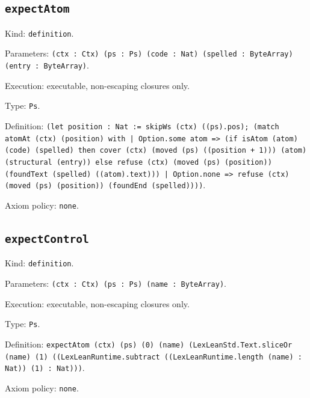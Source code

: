 \documentclass[11pt]{article}
\begin{document}
\subsection*{\texttt{expectAtom}}
\noindent Kind: \texttt{definition}.\par
\noindent Parameters: \texttt{(ctx : Ctx) (ps : Ps) (code : Nat) (spelled : ByteArray) (entry : ByteArray)}.\par
\noindent Execution: executable, non-escaping closures only.\par
\noindent Type: \texttt{Ps}.\par
\noindent Definition: \texttt{(let position : Nat := skipWs (ctx) ((ps).pos); (match atomAt (ctx) (position) with | Option.some atom => (if isAtom (atom) (code) (spelled) then cover (ctx) (moved (ps) ((position + 1))) (atom) (structural (entry)) else refuse (ctx) (moved (ps) (position)) (foundText (spelled) ((atom).text))) | Option.none => refuse (ctx) (moved (ps) (position)) (foundEnd (spelled))))}.\par
\noindent Axiom policy: \texttt{none}.\par
\subsection*{\texttt{expectControl}}
\noindent Kind: \texttt{definition}.\par
\noindent Parameters: \texttt{(ctx : Ctx) (ps : Ps) (name : ByteArray)}.\par
\noindent Execution: executable, non-escaping closures only.\par
\noindent Type: \texttt{Ps}.\par
\noindent Definition: \texttt{expectAtom (ctx) (ps) (0) (name) (LexLeanStd.Text.sliceOr (name) (1) ((LexLeanRuntime.subtract ((LexLeanRuntime.length (name) : Nat)) (1) : Nat)))}.\par
\noindent Axiom policy: \texttt{none}.\par
\end{document}
